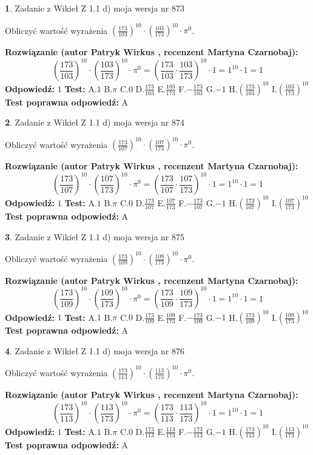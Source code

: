 \documentclass[12pt, a4paper]{article}
\theoremstyle{definition} %
\newtheorem{zad}{}
\newcommand{\zadStart}[1]{\begin{zad}#1\newline}
\newcommand{\zadStop}{\end{zad}}
\newcommand{\rozwStart}[2]{\noindent \textbf{Rozwiązanie (autor #1 , recenzent #2): }\newline}
\newcommand{\rozwStop}{\newline}
\newcommand{\odpStart}{\noindent \textbf{Odpowiedź:}\newline}
\newcommand{\odpStop}{\newline}
\newcommand{\testStart}{\noindent \textbf{Test:}\newline}
\newcommand{\testStop}{\newline}
\newcommand{\kluczStart}{\noindent \textbf{Test poprawna odpowiedź:}\newline}
\newcommand{\kluczStop}{\newline}
\begin{document}
\zadStart{Zadanie z Wikieł Z 1.1 d) moja wersja nr 873}

Obliczyć wartość wyrażenia $(\frac{173}{103})^{10} \cdot (\frac{103}{173})^{10} \cdot \pi^{0}$.
\zadStop
\rozwStart{Patryk Wirkus}{Martyna Czarnobaj}
$$(\frac{173}{103})^{10} \cdot (\frac{103}{173})^{10} \cdot \pi^{0} = (\frac{173}{103} \cdot \frac{103}{173})^{10} \cdot 1 = 1^{10} \cdot 1 = 1$$
\rozwStop
\odpStart
$1$
\odpStop
\testStart
A.$1$ B.$\pi$ C.$0$ D.$\frac{173}{103}$ E.$\frac{103}{173}$
F.$-\frac{173}{103}$ G.$-1$
H.$(\frac{173}{103})^{10}$
I.$(\frac{103}{173})^{10}$
\testStop
\kluczStart
A
\kluczStop



\zadStart{Zadanie z Wikieł Z 1.1 d) moja wersja nr 874}

Obliczyć wartość wyrażenia $(\frac{173}{107})^{10} \cdot (\frac{107}{173})^{10} \cdot \pi^{0}$.
\zadStop
\rozwStart{Patryk Wirkus}{Martyna Czarnobaj}
$$(\frac{173}{107})^{10} \cdot (\frac{107}{173})^{10} \cdot \pi^{0} = (\frac{173}{107} \cdot \frac{107}{173})^{10} \cdot 1 = 1^{10} \cdot 1 = 1$$
\rozwStop
\odpStart
$1$
\odpStop
\testStart
A.$1$ B.$\pi$ C.$0$ D.$\frac{173}{107}$ E.$\frac{107}{173}$
F.$-\frac{173}{107}$ G.$-1$
H.$(\frac{173}{107})^{10}$
I.$(\frac{107}{173})^{10}$
\testStop
\kluczStart
A
\kluczStop



\zadStart{Zadanie z Wikieł Z 1.1 d) moja wersja nr 875}

Obliczyć wartość wyrażenia $(\frac{173}{109})^{10} \cdot (\frac{109}{173})^{10} \cdot \pi^{0}$.
\zadStop
\rozwStart{Patryk Wirkus}{Martyna Czarnobaj}
$$(\frac{173}{109})^{10} \cdot (\frac{109}{173})^{10} \cdot \pi^{0} = (\frac{173}{109} \cdot \frac{109}{173})^{10} \cdot 1 = 1^{10} \cdot 1 = 1$$
\rozwStop
\odpStart
$1$
\odpStop
\testStart
A.$1$ B.$\pi$ C.$0$ D.$\frac{173}{109}$ E.$\frac{109}{173}$
F.$-\frac{173}{109}$ G.$-1$
H.$(\frac{173}{109})^{10}$
I.$(\frac{109}{173})^{10}$
\testStop
\kluczStart
A
\kluczStop



\zadStart{Zadanie z Wikieł Z 1.1 d) moja wersja nr 876}

Obliczyć wartość wyrażenia $(\frac{173}{113})^{10} \cdot (\frac{113}{173})^{10} \cdot \pi^{0}$.
\zadStop
\rozwStart{Patryk Wirkus}{Martyna Czarnobaj}
$$(\frac{173}{113})^{10} \cdot (\frac{113}{173})^{10} \cdot \pi^{0} = (\frac{173}{113} \cdot \frac{113}{173})^{10} \cdot 1 = 1^{10} \cdot 1 = 1$$
\rozwStop
\odpStart
$1$
\odpStop
\testStart
A.$1$ B.$\pi$ C.$0$ D.$\frac{173}{113}$ E.$\frac{113}{173}$
F.$-\frac{173}{113}$ G.$-1$
H.$(\frac{173}{113})^{10}$
I.$(\frac{113}{173})^{10}$
\testStop
\kluczStart
A
\kluczStop
\end{document}
